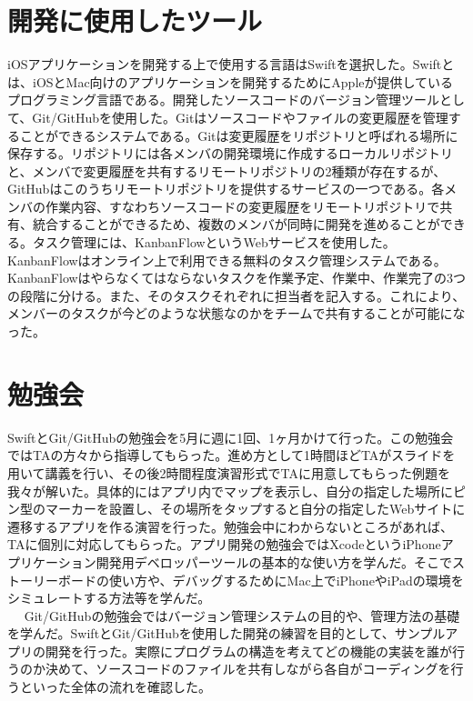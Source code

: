 \section{開発に使用したツール}

iOSアプリケーションを開発する上で使用する言語はSwiftを選択した。Swiftとは、iOSとMac向けのアプリケーションを開発するためにAppleが提供しているプログラミング言語である。開発したソースコードのバージョン管理ツールとして、Git/GitHubを使用した。Gitはソースコードやファイルの変更履歴を管理することができるシステムである。Gitは変更履歴をリポジトリと呼ばれる場所に保存する。リポジトリには各メンバの開発環境に作成するローカルリポジトリと、メンバで変更履歴を共有するリモートリポジトリの2種類が存在するが、GitHubはこのうちリモートリポジトリを提供するサービスの一つである。各メンバの作業内容、すなわちソースコードの変更履歴をリモートリポジトリで共有、統合することができるため、複数のメンバが同時に開発を進めることができる。タスク管理には、KanbanFlowというWebサービスを使用した。KanbanFlowはオンライン上で利用できる無料のタスク管理システムである。KanbanFlowはやらなくてはならないタスクを作業予定、作業中、作業完了の3つの段階に分ける。また、そのタスクそれぞれに担当者を記入する。これにより、メンバーのタスクが今どのような状態なのかをチームで共有することが可能になった。

\section{勉強会}
SwiftとGit/GitHubの勉強会を5月に週に1回、1ヶ月かけて行った。この勉強会ではTAの方々から指導してもらった。進め方として1時間ほどTAがスライドを用いて講義を行い、その後2時間程度演習形式でTAに用意してもらった例題を我々が解いた。具体的にはアプリ内でマップを表示し、自分の指定した場所にピン型のマーカーを設置し、その場所をタップすると自分の指定したWebサイトに遷移するアプリを作る演習を行った。勉強会中にわからないところがあれば、TAに個別に対応してもらった。アプリ開発の勉強会ではXcodeというiPhoneアプリケーション開発用デベロッパーツールの基本的な使い方を学んだ。そこでストーリーボードの使い方や、デバッグするためにMac上でiPhoneやiPadの環境をシミュレートする方法等を学んだ。\\　
Git/GitHubの勉強会ではバージョン管理システムの目的や、管理方法の基礎を学んだ。SwiftとGit/GitHubを使用した開発の練習を目的として、サンプルアプリの開発を行った。実際にプログラムの構造を考えてどの機能の実装を誰が行うのか決めて、ソースコードのファイルを共有しながら各自がコーディングを行うといった全体の流れを確認した。

